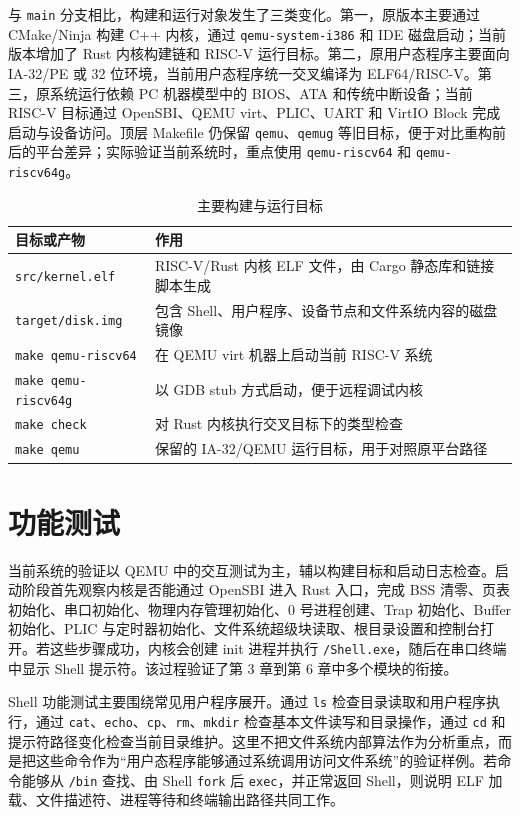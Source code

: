 与 \verb|main| 分支相比，构建和运行对象发生了三类变化。第一，原版本主要通过 CMake/Ninja 构建 C++ 内核，通过 \verb|qemu-system-i386| 和 IDE 磁盘启动；当前版本增加了 Rust 内核构建链和 RISC-V 运行目标。第二，原用户态程序主要面向 IA-32/PE 或 32 位环境，当前用户态程序统一交叉编译为 ELF64/RISC-V。第三，原系统运行依赖 PC 机器模型中的 BIOS、ATA 和传统中断设备；当前 RISC-V 目标通过 OpenSBI、QEMU virt、PLIC、UART 和 VirtIO Block 完成启动与设备访问。顶层 Makefile 仍保留 \verb|qemu|、\verb|qemug| 等旧目标，便于对比重构前后的平台差异；实际验证当前系统时，重点使用 \verb|qemu-riscv64| 和 \verb|qemu-riscv64g|。

\begin{table}[htbp]
  \centering
  \caption{主要构建与运行目标}\label{tab:build-targets}
  \begin{tabular}{p{}p{}}
    \toprule
    目标或产物 & 作用 \\
    \midrule
    \verb|src/kernel.elf| & RISC-V/Rust 内核 ELF 文件，由 Cargo 静态库和链接脚本生成 \\
    \verb|target/disk.img| & 包含 Shell、用户程序、设备节点和文件系统内容的磁盘镜像 \\
    \verb|make qemu-riscv64| & 在 QEMU virt 机器上启动当前 RISC-V 系统 \\
    \verb|make qemu-riscv64g| & 以 GDB stub 方式启动，便于远程调试内核 \\
    \verb|make check| & 对 Rust 内核执行交叉目标下的类型检查 \\
    \verb|make qemu| & 保留的 IA-32/QEMU 运行目标，用于对照原平台路径 \\
    \bottomrule
  \end{tabular}
\end{table}

\section{功能测试}

当前系统的验证以 QEMU 中的交互测试为主，辅以构建目标和启动日志检查。启动阶段首先观察内核是否能通过 OpenSBI 进入 Rust 入口，完成 BSS 清零、页表初始化、串口初始化、物理内存管理初始化、0 号进程创建、Trap 初始化、Buffer 初始化、PLIC 与定时器初始化、文件系统超级块读取、根目录设置和控制台打开。若这些步骤成功，内核会创建 init 进程并执行 \verb|/Shell.exe|，随后在串口终端中显示 Shell 提示符。该过程验证了第 3 章到第 6 章中多个模块的衔接。

Shell 功能测试主要围绕常见用户程序展开。通过 \verb|ls| 检查目录读取和用户程序执行，通过 \verb|cat|、\verb|echo|、\verb|cp|、\verb|rm|、\verb|mkdir| 检查基本文件读写和目录操作，通过 \verb|cd| 和提示符路径变化检查当前目录维护。这里不把文件系统内部算法作为分析重点，而是把这些命令作为“用户态程序能够通过系统调用访问文件系统”的验证样例。若命令能够从 \verb|/bin| 查找、由 Shell \verb|fork| 后 \verb|exec|，并正常返回 Shell，则说明 ELF 加载、文件描述符、进程等待和终端输出路径共同工作。

